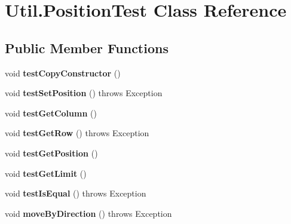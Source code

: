 \hypertarget{classUtil_1_1PositionTest}{\section{Util.\-Position\-Test Class Reference}
\label{classUtil_1_1PositionTest}
}
\subsection*{Public Member Functions}
\begin{DoxyCompactItemize}
\item 
\hypertarget{classUtil_1_1PositionTest_abad53901951866ac24ccab41d83595f1}{void {\bfseries test\-Copy\-Constructor} ()}\label{classUtil_1_1PositionTest_abad53901951866ac24ccab41d83595f1}

\item 
\hypertarget{classUtil_1_1PositionTest_ab016a4af959d55de59a58ac7a8fdff68}{void {\bfseries test\-Set\-Position} ()  throws Exception}\label{classUtil_1_1PositionTest_ab016a4af959d55de59a58ac7a8fdff68}

\item 
\hypertarget{classUtil_1_1PositionTest_ad0e41196d6b5bde74ab8170575671b5c}{void {\bfseries test\-Get\-Column} ()}\label{classUtil_1_1PositionTest_ad0e41196d6b5bde74ab8170575671b5c}

\item 
\hypertarget{classUtil_1_1PositionTest_a82c4f7ea39c88c449b8654b1aedb35ec}{void {\bfseries test\-Get\-Row} ()  throws Exception}\label{classUtil_1_1PositionTest_a82c4f7ea39c88c449b8654b1aedb35ec}

\item 
\hypertarget{classUtil_1_1PositionTest_a0ada1045ee082acbc9f068111ed7f895}{void {\bfseries test\-Get\-Position} ()}\label{classUtil_1_1PositionTest_a0ada1045ee082acbc9f068111ed7f895}

\item 
\hypertarget{classUtil_1_1PositionTest_aa31a6880448a3bbd018a12496fed94b3}{void {\bfseries test\-Get\-Limit} ()}\label{classUtil_1_1PositionTest_aa31a6880448a3bbd018a12496fed94b3}

\item 
\hypertarget{classUtil_1_1PositionTest_a43502822ffa29a4618cb1a1f6bfbf80e}{void {\bfseries test\-Is\-Equal} ()  throws Exception}\label{classUtil_1_1PositionTest_a43502822ffa29a4618cb1a1f6bfbf80e}

\item 
\hypertarget{classUtil_1_1PositionTest_a74ed65d7aa3792e524fbc4130a7db79c}{void {\bfseries move\-By\-Direction} ()  throws Exception }\label{classUtil_1_1PositionTest_a74ed65d7aa3792e524fbc4130a7db79c}

\end{DoxyCompactItemize}
